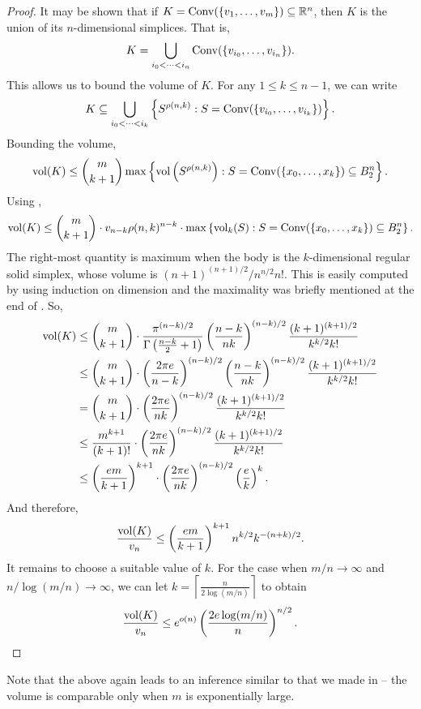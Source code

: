 \begin{proof}
It may be shown that if $K=\operatorname{Conv}(\{v_1,\ldots,v_m\})\subseteq\mathbb{R}^n$, then $K$ is the union of its $n$-dimensional simplices. That is,
\[ K = \bigcup_{i_0 < \cdots < i_n} \operatorname{Conv}(\{v_{i_0},\ldots,v_{i_n}\}). \]
This allows us to bound the volume of $K$. For any $1\leq k\leq n-1$, we can write
\[ K \subseteq \bigcup_{i_0 < \cdots < i_k} \left\{S^{\rho(n,k)} : S=\operatorname{Conv}(\{v_{i_0},\ldots,v_{i_k}\})\right\}. \]
Bounding the volume,
\[ \operatorname{vol}(K) \leq \binom{m}{k+1} \max\left\{\operatorname{vol}\left(S^{\rho(n,k)}\right) : S=\operatorname{Conv}(\{x_0,\ldots,x_k\})\subseteq B_2^n\right\}. \]
Using ,
\[ \operatorname{vol}(K) \leq \binom{m}{k+1} \cdot v_{n-k} \rho(n,k)^{n-k} \cdot \max\left\{\operatorname{vol}_k(S) : S=\operatorname{Conv}(\{x_0,\ldots,x_k\})\subseteq B_2^n\right\}. \]
The right-most quantity is maximum when the body is the $k$-dimensional regular solid simplex, whose volume is $(n+1)^{(n+1)/2}/n^{n/2}n!$. This is easily computed by using induction on dimension and the maximality was briefly mentioned at the end of . So,
\begin{align*}
    \operatorname{vol}(K) &\leq \binom{m}{k+1} \cdot \frac{\pi^{(n-k)/2}}{\Gamma\left(\frac{n-k}{2}+1\right)} \left(\frac{n-k}{nk}\right)^{(n-k)/2} \frac{(k+1)^{(k+1)/2}}{k^{k/2}k!} \\
    &\leq \binom{m}{k+1} \cdot \left(\frac{2\pi e}{n-k}\right)^{(n-k)/2} \left(\frac{n-k}{nk}\right)^{(n-k)/2} \frac{(k+1)^{(k+1)/2}}{k^{k/2}k!} \\
    &= \binom{m}{k+1} \cdot \left(\frac{2\pi e}{nk}\right)^{(n-k)/2} \frac{(k+1)^{(k+1)/2}}{k^{k/2}k!} \\
    &\leq \frac{m^{k+1}}{(k+1)!} \cdot \left(\frac{2\pi e}{nk}\right)^{(n-k)/2} \frac{(k+1)^{(k+1)/2}}{k^{k/2}k!} \\
    &\leq \left(\frac{em}{k+1}\right)^{k+1} \cdot \left(\frac{2\pi e}{nk}\right)^{(n-k)/2} \left(\frac{e}{k}\right)^k.
\end{align*}
And therefore,
\[ \frac{\operatorname{vol} (K)}{v_n} \leq \left(\frac{em}{k+1}\right)^{k+1} n^{k/2} k^{-(n+k)/2}. \]
It remains to choose a suitable value of $k$. For the case when $m/n\to\infty$ and $n/\log(m/n)\to\infty$, we can let $k = \left\lceil \frac{n}{2\log(m/n)} \right\rceil$ to obtain
\[ \frac{\operatorname{vol}(K)}{v_n} \leq e^{o(n)} \left(\frac{2e\log(m/n)}{n}\right)^{n/2}. \]
\end{proof}

Note that the above again leads to an inference similar to that we made in  -- the volume is comparable only when $m$ is exponentially large.\\

